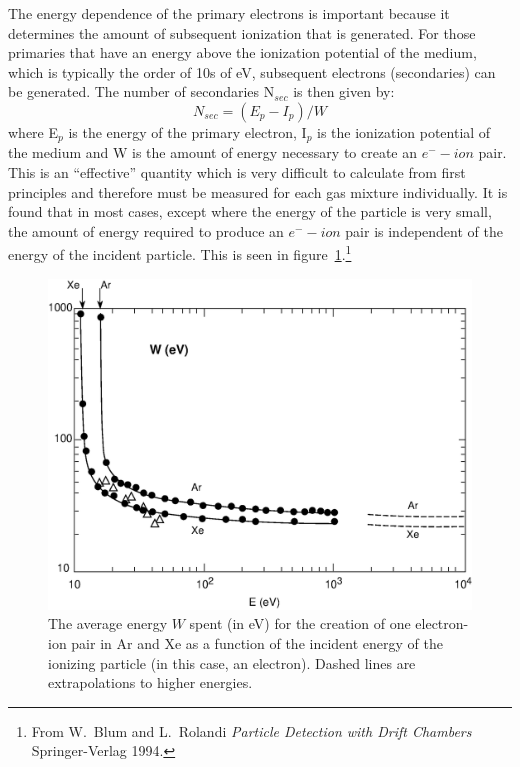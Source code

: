 \documentclass[twoside]{article}
\begin{document}
The energy dependence of the primary electrons is important because
it determines the amount of subsequent ionization that is generated.
For those primaries that have an energy above the ionization potential 
of the medium, which is typically the order of 10s of eV, subsequent 
electrons (secondaries) can be generated.  The number of secondaries 
N$_{sec}$ is then given by:
\begin{equation}
        N_{sec} = (E_{p} - I_{p})/W
\label{eq:secondary}
\end{equation}
where E$_{p}$ is the energy of the primary electron, I$_{p}$ is the 
ionization potential of the medium and W is the amount of energy necessary
to create an $e^{-}-ion$ pair. This is an ``effective'' quantity
which is very difficult to calculate from first principles and therefore
must be measured for each gas mixture individually.  It is found
that in most cases, except where the energy of the particle is very
small, the amount of energy required to produce an $e^{-}-ion$ pair
is independent of the energy of the incident particle.  This is seen
in figure~\ref{fig:W}.\footnote{From W.~Blum and L.~Rolandi
  {\em Particle Detection with Drift Chambers} Springer-Verlag 1994.}
\begin{figure}[htb]
\begin{center}
\includegraphics[width=.55\textwidth]{./pics/W.eps}
\caption{The average energy $W$ spent (in eV) for the creation
  of one electron-ion pair in Ar and Xe as a function of the incident
  energy of the ionizing particle (in this case, an electron).
  Dashed lines are extrapolations to higher energies.}
\label{fig:W}
\end{center}
\end{figure}
\end{document}
